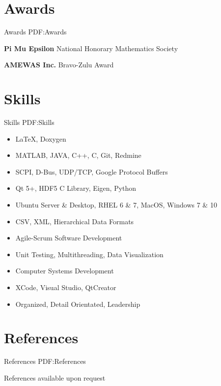 \documentclass[a4paper,10pt,oneside]{article}
\begin{document}
\begin{body}
\section
{Awards}
{Awards}
{PDF:Awards}

{\textbf{Pi Mu Epsilon}} National Honorary Mathematics Society
\hfill
{}

{\textbf{AMEWAS Inc.}} Bravo-Zulu Award
\hfill
{}

\section
{Skills}
{Skills}
{PDF:Skills} 
\begin{multicols}{2}
\par
    \begin{itemize}
        \item {\LaTeX}, Doxygen
        \item MATLAB, JAVA, C++, C, Git, Redmine
        \item SCPI, D-Bus, UDP/TCP, Google Protocol Buffers
        \item Qt 5+, HDF5 C Library, Eigen, Python
        \item Ubuntu Server \& Desktop, RHEL 6 \& 7, MacOS, Windows 7 \& 10
        \item CSV, XML, Hierarchical Data Formats
        \item Agile-Scrum Software Development
        \item Unit Testing, Multithreading, Data Visualization
        \item Computer Systems Development
        \item XCode, Visual Studio, QtCreator
        \item Organized, Detail Orientated, Leadership
    \end{itemize}
\end{multicols}

\section
{References}
{References}
{PDF:References}

References available upon request
\label{LastPage}~
\end{body}
\end{document}

